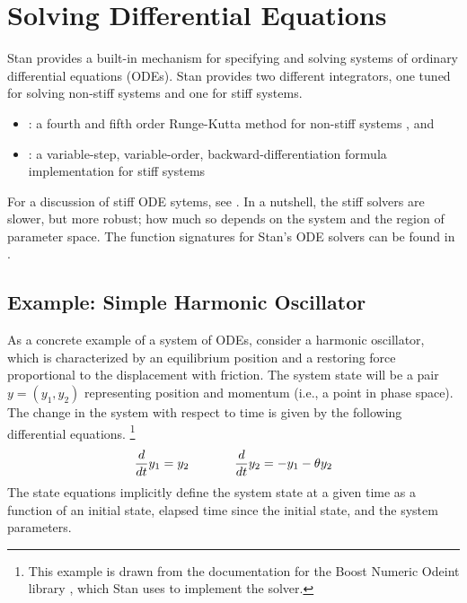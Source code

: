 \chapter{Solving Differential Equations}\label{ode-solver.chapter}

\noindent
Stan provides a built-in mechanism for specifying and solving systems
of ordinary differential equations (ODEs).  Stan provides two
different integrators, one tuned for solving non-stiff systems and one
for stiff systems.
%
\begin{itemize}
\item {}: a fourth and fifth order Runge-Kutta method for
  non-stiff systems \citep{DormandPrince:1980,AhnertMulansky:2011}, and
\item {}: a variable-step, variable-order,
  backward-differentiation formula implementation for stiff systems
  \citep{CohenHindmarsh:1996,SerbanHindmarsh:2005}
\end{itemize}
%
For a discussion of stiff ODE sytems, see .  In
a nutshell, the stiff solvers are slower, but more robust;  how much
so depends on the system and the region of parameter space.
The function signatures for Stan's ODE solvers can be found in
.


\section{Example: Simple Harmonic Oscillator}

As a concrete example of a system of ODEs, consider a harmonic
oscillator, which is characterized by an equilibrium position and a
restoring force proportional to the displacement with friction.  
The system state will be a pair $y = (y_1, y_2)$ representing position
and momentum (i.e., a point in phase space).  The change in the system
with respect to time is given by the following differential equations.%
%
\footnote{This example is drawn from the documentation for the Boost
  Numeric Odeint library \citep{AhnertMulansky:2011}, which Stan uses
  to implement the  solver.}
%
\begin{equation}\label{ode-sho.equation}
\frac{d}{dt} y_1 = y_2 
\hspace*{0.5in}
\frac{d}{dt} y_2 = -y_1 - \theta y_2
\end{equation}
%
The state equations implicitly define the system state at a given time
as a function of an initial state, elapsed time since the initial
state, and the system parameters.

